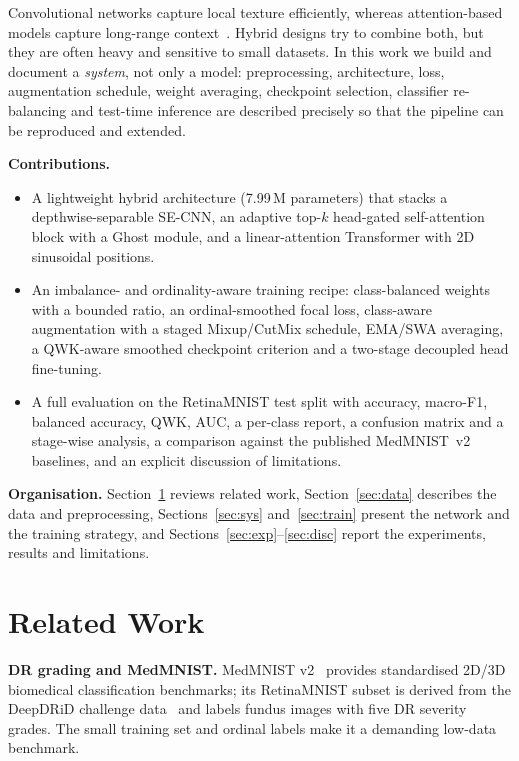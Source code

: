 \documentclass[10pt,twocolumn]{article}
\begin{document}
Convolutional networks capture local texture efficiently, whereas attention-based models capture long-range context~\cite{vaswani,vit}. Hybrid designs try to combine both, but they are often heavy and sensitive to small datasets. In this work we build and document a \emph{system}, not only a model: preprocessing, architecture, loss, augmentation schedule, weight averaging, checkpoint selection, classifier re-balancing and test-time inference are described precisely so that the pipeline can be reproduced and extended.

\textbf{Contributions.}
\begin{itemize}
\item A lightweight hybrid architecture (7.99\,M parameters) that stacks a depthwise-separable SE-CNN, an adaptive top-$k$ head-gated self-attention block with a Ghost module, and a linear-attention Transformer with 2D sinusoidal positions.
\item An imbalance- and ordinality-aware training recipe: class-balanced weights with a bounded ratio, an ordinal-smoothed focal loss, class-aware augmentation with a staged Mixup/CutMix schedule, EMA/SWA averaging, a QWK-aware smoothed checkpoint criterion and a two-stage decoupled head fine-tuning.
\item A full evaluation on the RetinaMNIST test split with accuracy, macro-F1, balanced accuracy, QWK, AUC, a per-class report, a confusion matrix and a stage-wise analysis, a comparison against the published MedMNIST~v2 baselines, and an explicit discussion of limitations.
\end{itemize}

\textbf{Organisation.} Section~\ref{sec:rel} reviews related work, Section~\ref{sec:data} describes the data and preprocessing, Sections~\ref{sec:sys} and~\ref{sec:train} present the network and the training strategy, and Sections~\ref{sec:exp}--\ref{sec:disc} report the experiments, results and limitations.

\section{Related Work}\label{sec:rel}
\textbf{DR grading and MedMNIST.} MedMNIST v2~\cite{medmnistv2} provides standardised 2D/3D biomedical classification benchmarks; its RetinaMNIST subset is derived from the DeepDRiD challenge data~\cite{deepdrid} and labels fundus images with five DR severity grades. The small training set and ordinal labels make it a demanding low-data benchmark.
\end{document}
